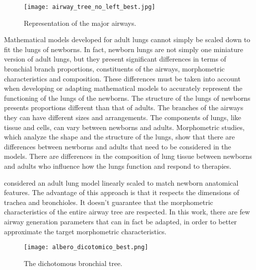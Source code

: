 \begin{figure}[H]\centering
  \texttt{[image: airway\_tree\_no\_left\_best.jpg]}
  \caption{Representation of the major airways.}
  \label{fig:airway_tree_anatomical}
\end{figure}

Mathematical models developed for adult lungs cannot simply be scaled
down to fit the lungs of newborns. In fact, newborn lungs are not
simply one miniature version of adult lungs, but they present
significant differences in terms of bronchial branch proportions,
constituents of the airways\cite{merkus1996}, morphometric
characteristics\cite{horsfield1987} and
composition\cite{hislop1989}. These differences must be taken into
account when developing or adapting mathematical models to accurately
represent the functioning of the lungs of the newborns. The structure
of the lungs of newborns presents proportions different than that of
adults. The branches of the airways they can have different sizes and
arrangements. The components of lungs, like tissue and cells, can vary
between newborns and adults. Morphometric studies, which analyze the
shape and the structure of the lungs, show that there are differences
between newborns and adults that need to be considered in the
models\cite[][Ch. 1.1]{mani2020}. There are differences in the
composition of lung tissue between newborns and adults who influence
how the lungs function and respond to therapies.


\textcite{mani2020} considered an adult lung model linearly scaled to
match newborn anatomical features.  The advantage of this approach is
that it respects the dimensions of trachea and bronchioles. It doesn't
guarantee that the morphometric characteristics of the entire airway
tree are respected.  In this work, there are few airway generation
parameters that can in fact be adapted, in order to better approximate
the target morphometric characteristics.


\begin{figure}[H]\centering
  \texttt{[image: albero\_dicotomico\_best.png]}
  \caption{The dichotomous bronchial tree.}
  \label{fig:albero_dicotomico_anatomical}
\end{figure}

